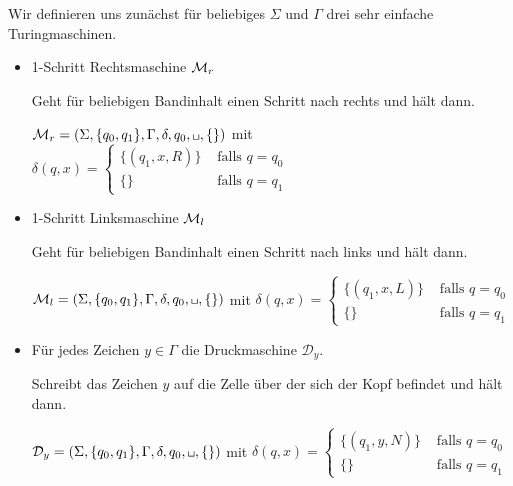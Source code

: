 \begin{Bsp} Wir definieren uns zunächst für beliebiges $\Sigma$ und $\Gamma$ drei sehr einfache Turingmaschinen. 
 \begin{itemize}
  \item 1-Schritt Rechtsmaschine $\mathcal{M}_r$
  
  Geht für beliebigen Bandinhalt einen Schritt nach rechts und hält dann.
  
  $\M_r=\left(\Sigma,\{q_0,q_1\},\Gamma,\delta,q_0,\blank,\{\}\right)$ mit
  $\delta(q,x)=\begin{cases}\{(q_1, x, R)\} & \text{ falls } q = q_0\\ \{\} & \text{ falls } q = q_1\end{cases}$
  
  \item 1-Schritt Linksmaschine $\mathcal{M}_l$
  
  Geht für beliebigen Bandinhalt einen Schritt nach links und hält dann.

  $\M_l=\left(\Sigma,\{q_0,q_1\},\Gamma,\delta,q_0,\blank,\{\}\right)$ mit
  $\delta(q,x)=\begin{cases}\{(q_1, x, L)\} & \text{ falls } q = q_0\\ \{\} & \text{ falls } q = q_1\end{cases}$
  
  \item Für jedes Zeichen $y\in\Gamma$ die Druckmaschine $\mathcal{D}_y$.
  
  Schreibt das Zeichen $y$ auf die Zelle über der sich der Kopf befindet und hält dann.

  $\mathcal{D}_y=\left(\Sigma,\{q_0,q_1\},\Gamma,\delta,q_0,\blank,\{\}\right)$ mit
  $\delta(q,x)=\begin{cases}\{(q_1, y, N)\} & \text{ falls } q = q_0\\ \{\} & \text{ falls } q = q_1\end{cases}$

 \end{itemize}
\end{Bsp}

